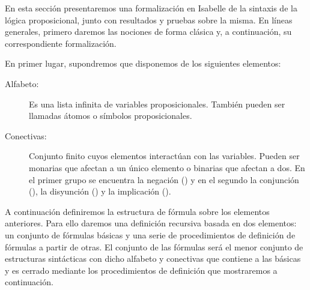 %
\begin{isabellebody}%
%
%
\isadelimtheory
%
\endisadelimtheory
%
\isatagtheory
%
\endisatagtheory
{\isafoldtheory}%
%
\isadelimtheory
%
\endisadelimtheory
%
\isadelimdocument
%
\endisadelimdocument
%
\isatagdocument
%
\isamarkuptrue%
%
\endisatagdocument
{\isafolddocument}%
%
\isadelimdocument
%
\endisadelimdocument
%
\begin{isamarkuptext}%
En esta sección presentaremos una formalización en Isabelle de la 
  sintaxis de la lógica proposicional, junto con resultados y pruebas 
  sobre la misma. En líneas generales, primero daremos las nociones de 
  forma clásica y, a continuación, su correspondiente formalización.

  En primer lugar, supondremos que disponemos de los siguientes 
  elementos:
  \begin{description}
    \item[Alfabeto:] Es una lista infinita de variables proposicionales. 
      También pueden ser llamadas átomos o símbolos proposicionales.
    \item[Conectivas:] Conjunto finito cuyos elementos interactúan con 
      las variables. Pueden ser monarias que afectan a un único elemento 
      o binarias que afectan a dos. En el primer grupo se encuentra la 
      negación (\isa{{\isasymnot}}) y en el segundo la conjunción (\isa{{\isasymand}}), la disyunción 
      (\isa{{\isasymor}}) y la implicación (\isa{{\isasymlongrightarrow}}).
  \end{description}

  A continuación definiremos la estructura de fórmula sobre los 
  elementos anteriores. Para ello daremos una definición recursiva 
  basada en dos elementos: un conjunto de fórmulas básicas y una serie 
  de procedimientos de definición de fórmulas a partir de otras. El 
  conjunto de las fórmulas será el menor conjunto de estructuras 
  sintácticas con dicho alfabeto y conectivas que contiene a las básicas 
  y es cerrado mediante los procedimientos de definición que mostraremos 
  a continuación.


\end{isamarkuptext}
\end{isabellebody}
